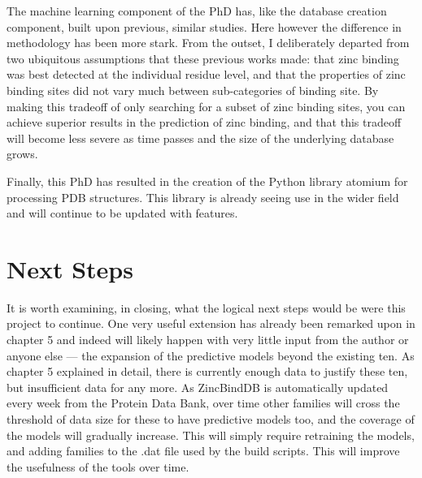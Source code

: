 The machine learning component of the PhD has, like the database creation component, built upon previous, similar studies. Here however the difference in methodology has been more stark. From the outset, I deliberately departed from two ubiquitous assumptions that these previous works made: that zinc binding was best detected at the individual residue level, and that the properties of zinc binding sites did not vary much between sub-categories of binding site. By making this tradeoff of only searching for a subset of zinc binding sites, you can achieve superior results in the prediction of zinc binding, and that this tradeoff will become less severe as time passes and the size of the underlying database grows.

Finally, this PhD has resulted in the creation of the Python library atomium for processing PDB structures. This library is already seeing use in the wider field and will continue to be updated with features.

\section{Next Steps}

It is worth examining, in closing, what the logical next steps would be were this project to continue. One very useful extension has already been remarked upon in chapter 5 and indeed will likely happen with very little input from the author or anyone else --- the expansion of the predictive models beyond the existing ten. As chapter 5 explained in detail, there is currently enough data to justify these ten, but insufficient data for any more. As ZincBindDB is automatically updated every week from the Protein Data Bank, over time other families will cross the threshold of data size for these to have predictive models too, and the coverage of the models will gradually increase. This will simply require retraining the models, and adding families to the .dat file used by the build scripts. This will improve the usefulness of the tools over time.

